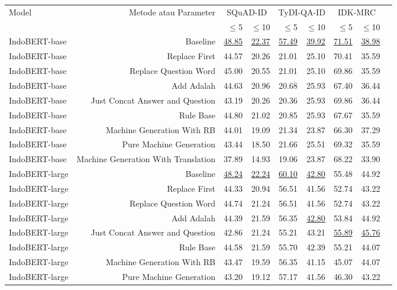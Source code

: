 \begin{table}[H]\centering
\scriptsize
\begin{tabular}{lrrrrrrrr}\toprule
\multirow{2}{*}{Model} &\multirow{2}{*}{Metode atau Parameter} &\multicolumn{2}{c}{SQuAD-ID} &\multicolumn{2}{c}{TyDI-QA-ID} &\multicolumn{2}{c}{IDK-MRC} \\\cmidrule{3-8}
& &$\leq$5 &$\leq$10 &$\leq$5 &$\leq$10 &$\leq$5 &$\leq$10 \\\midrule
IndoBERT-base &Baseline &\underline{48.85} &\underline{22.37} &\underline{57.49} &\underline{39.92} &\underline{71.51} &\underline{38.98} \\
IndoBERT-base &Replace First &44.57 &20.26 &21.01 &25.10 &70.41 &35.59 \\
IndoBERT-base &Replace Question Word &45.00 &20.55 &21.01 &25.10 &69.86 &35.59 \\
IndoBERT-base &Add Adalah &44.63 &20.96 &20.68 &25.93 &67.40 &36.44 \\
IndoBERT-base &Just Concat Answer and Question &43.19 &20.26 &20.36 &25.93 &69.86 &36.44 \\
IndoBERT-base &Rule Base &44.80 &21.02 &20.85 &25.93 &67.67 &35.59 \\
IndoBERT-base &Machine Generation With RB &44.01 &19.09 &21.34 &23.87 &66.30 &37.29 \\
IndoBERT-base &Pure Machine Generation &43.44 &18.50 &21.66 &25.51 &69.32 &35.59 \\
IndoBERT-base &Machine Generation With Translation &37.89 &14.93 &19.06 &23.87 &68.22 &33.90 \\
\hline
IndoBERT-large &Baseline &\underline{48.24} &\underline{22.24} &\underline{60.10} &\underline{42.80} &55.48 &44.92 \\
IndoBERT-large &Replace First &44.33 &20.94 &56.51 &41.56 &52.74 &43.22 \\
IndoBERT-large &Replace Question Word &44.74 &21.24 &56.51 &41.56 &52.74 &43.22 \\
IndoBERT-large &Add Adalah &44.39 &21.59 &56.35 &\underline{42.80} &53.84 &44.92 \\
IndoBERT-large &Just Concat Answer and Question &42.86 &21.24 &55.21 &43.21 &\underline{55.89} &\underline{45.76} \\
IndoBERT-large &Rule Base &44.58 &21.59 &55.70 &42.39 &55.21 &44.07 \\
IndoBERT-large &Machine Generation With RB &43.47 &19.59 &56.35 &41.15 &45.07 &44.07 \\
IndoBERT-large &Pure Machine Generation &43.20 &19.12 &57.17 &41.56 &46.30 &43.22 \\

\end{tabular}
\end{table}
